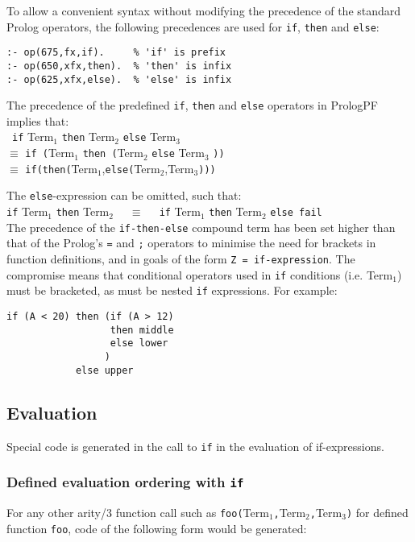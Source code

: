 To allow a convenient syntax without modifying the precedence of the standard
Prolog operators, the following precedences are used for \texttt{if},
\texttt{then} and \texttt{else}:
\begin{verbatim}
:- op(675,fx,if).     % 'if' is prefix
:- op(650,xfx,then).  % 'then' is infix
:- op(625,xfx,else).  % 'else' is infix
\end{verbatim}
The precedence of the predefined \texttt{if}, \texttt{then} and \texttt{else}
operators in PrologPF implies that:\\\
\texttt{if} Term$_1$ \texttt{then} Term$_2$ \texttt{else} Term$_3$\\
$\equiv$ \texttt{if (}Term$_1$ \texttt{then (}Term$_2$ \texttt{else} Term$_3$ \texttt{))}\\
$\equiv$ \texttt{if(}\texttt{then(}Term$_1$,\texttt{else(}Term$_2$,Term$_3$\texttt{)))}

The \texttt{else}-expression can be omitted, such that:\\
\texttt{if} Term$_1$ \texttt{then} Term$_2$ \texttt{~~}$\equiv$
\texttt{~~if} Term$_1$ \texttt{then} Term$_2$ \texttt{else fail}\\

The precedence of the \texttt{if-then-else} compound term has been set
higher than that of the Prolog's \texttt{=} and \texttt{;} operators
to minimise the need
for brackets in function definitions, and in goals of the form
\texttt{Z = if-expression}.  The compromise means that conditional
operators used in \texttt{if} conditions (i.e. Term$_1$) must
be bracketed, as must be nested \texttt{if} expressions. For example:
\begin{verbatim}
if (A < 20) then (if (A > 12)
                  then middle
                  else lower
                 )
            else upper
\end{verbatim}

\subsection{Evaluation}

Special code is generated in the call to \texttt{if} in the evaluation of
if-expressions.

\subsubsection{Defined evaluation ordering with \texttt{if}}

For any other arity/3 function call such as
\mbox{\texttt{foo(}Term$_1$\texttt{,}Term$_2$\texttt{,}Term$_3$\texttt{)}}
for defined function \texttt{foo}, code
of the following form would be generated:


